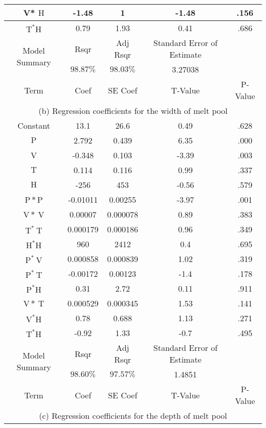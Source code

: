 \documentclass[10pt]{article}
\begin{document}
\begin{center}
\begin{tabular}{|c|c|c|c|c|}
\hline
V* $\mathrm{H}$ & -1.48 & 1 & -1.48 & .156 \\
\hline
$\mathrm{T}^{*} \mathrm{H}$ & 0.79 & 1.93 & 0.41 & .686 \\
\hline
\multirow[t]{2}{*}{Model Summary} & Rsqr & Adj Rsqr & Standard Error of Estimate &  \\
\hline
 & $98.87 \%$ & $98.03 \%$ & 3.27038 &  \\
\hline
Term & Coef & SE Coef & T-Value & P-Value \\
\hline
\multicolumn{5}{|c|}{(b) Regression coefficients for the width of melt pool} \\
\hline
Constant & 13.1 & 26.6 & 0.49 & .628 \\
\hline
$\mathrm{P}$ & 2.792 & 0.439 & 6.35 & .000 \\
\hline
V & -0.348 & 0.103 & -3.39 & .003 \\
\hline
$\mathrm{T}$ & 0.114 & 0.116 & 0.99 & .337 \\
\hline
$\mathrm{H}$ & -256 & 453 & -0.56 & .579 \\
\hline
$\mathrm{P} * \mathrm{P}$ & -0.01011 & 0.00255 & -3.97 & .001 \\
\hline
$\mathrm{V} * \mathrm{~V}$ & 0.00007 & 0.000078 & 0.89 & .383 \\
\hline
$\mathrm{T}^{*} \mathrm{~T}$ & 0.000179 & 0.000186 & 0.96 & .349 \\
\hline
$\mathrm{H}^{*} \mathrm{H}$ & 960 & 2412 & 0.4 & .695 \\
\hline
$\mathrm{P}^{*} \mathrm{~V}$ & 0.000858 & 0.000839 & 1.02 & .319 \\
\hline
$\mathrm{P}^{*} \mathrm{~T}$ & -0.00172 & 0.00123 & -1.4 & .178 \\
\hline
$\mathrm{P}^{*} \mathrm{H}$ & 0.31 & 2.72 & 0.11 & .911 \\
\hline
$\mathrm{V} * \mathrm{~T}$ & 0.000529 & 0.000345 & 1.53 & .141 \\
\hline
$\mathrm{V}^{*} \mathrm{H}$ & 0.78 & 0.688 & 1.13 & .271 \\
\hline
$\mathrm{T}^{*} \mathrm{H}$ & -0.92 & 1.33 & -0.7 & .495 \\
\hline
\multirow[t]{2}{*}{Model Summary} & Rsqr & Adj Rsqr & Standard Error of Estimate &  \\
\hline
 & $98.60 \%$ & $97.57 \%$ & 1.4851 &  \\
\hline
Term & Coef & SE Coef & T-Value & P-Value \\
\hline
\multicolumn{5}{|c|}{(c) Regression coefficients for the depth of melt pool} \\

\end{tabular}
\end{center}
\end{document}
